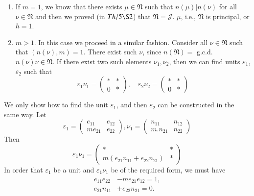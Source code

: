 \begin{proofoflemma}\label{chap1:sec3:thm2:polem2}
  \begin{enumerate}[\rm (1)]
  \item If $m=1$, we know that there exists $\mu \in \mathfrak{N}$
    such that $n(\mu) | n (\nu)$ for all $\nu \in \mathfrak{N}$ and
    then we proved (in $Th/5 \S 2$) that $\mathfrak{N}=
    \mathcal{J}$. $\mu$, i.e., $\mathfrak{N}$ is principal, or $h=1$. 
  \item $m > 1$. In this case we proceed in a similar
    fashion. Consider all $\nu \in \mathfrak{N}$ such that
    $(n(\nu),m)=1$. There exist such $\nu$, since $n(\mathfrak{N}) =$
    g.c.d. $n(\nu) \nu \in \mathfrak{N}$. If there exist two such\pageoriginale
    elements $\nu_1, \nu_2$, then we can find units $\varepsilon_1$,
    $\varepsilon_2$ such that 
    $$
    \varepsilon_1 \nu_1 = 
    \begin{pmatrix} 
      *& * \\ 0 & * 
    \end{pmatrix},  \quad
    \varepsilon_2 \nu_2 =
    \begin{pmatrix}
      * & * \\ 0 & *
    \end{pmatrix}  
    $$
  \end{enumerate}
  
  We only show how to find the unit $\varepsilon_1$, and then
  $\varepsilon_2$ can be constructed in the same way. Let 
  $$
  \varepsilon_1  = 
  \begin{pmatrix}
    e_{11}& e_{12} \\ me_{21} & e_{22}
  \end{pmatrix},
  \nu_1 = 
  \begin{pmatrix}
    n_{11} & n_{12} \\ m.n_{21} & n_{22}
  \end{pmatrix}
  $$
  Then 
  $$
  \varepsilon_1 \nu_1 = 
  \begin{pmatrix}
    * & * \\ m(e_{21}n_{11}+ e_{22}n_{21}) & *
  \end{pmatrix}
  $$
  In order that $\varepsilon_1$ be a unit and $\varepsilon_1 \nu_1$ be
  of the required form, we must have 
  \begin{align*}
    e_{11} e_{22} &- m e_{21} e_{12} =1, \\
    e_{21} n_{11} &+ e_{22} n_{21} = 0. 
  \end{align*}
\end{proofoflemma}

